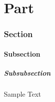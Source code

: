 \documentclass[12pt,a4paper]{article}
\begin{document}

%

%
%
%

\part{Part}
\section{Section}
\subsection{Subsection}
\subsubsection{Subsubsection}
Sample Text




\end{document}
